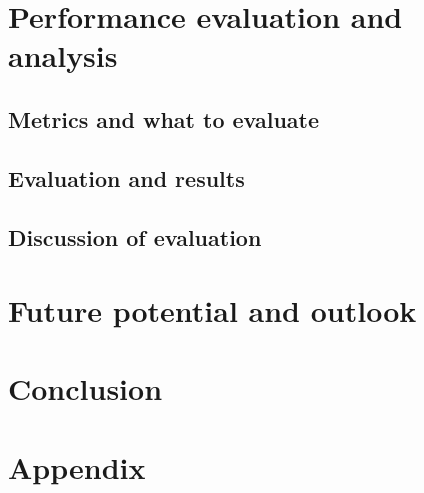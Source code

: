\documentclass[12pt, a4paper]{article}
\begin{document}
\section{Performance evaluation and analysis}
    \subsection{Metrics and what to evaluate}
    \subsection{Evaluation and results}
    \subsection{Discussion of evaluation}
\section{Future potential and outlook}
\section{Conclusion}

\newpage
\renewcommand{\thesubsection}{\Alph{subsection}}
\setcounter{page}{\value{lastroman}}
\section*{Appendix}


\newpage


\newpage
\listoffigures





\end{document}
